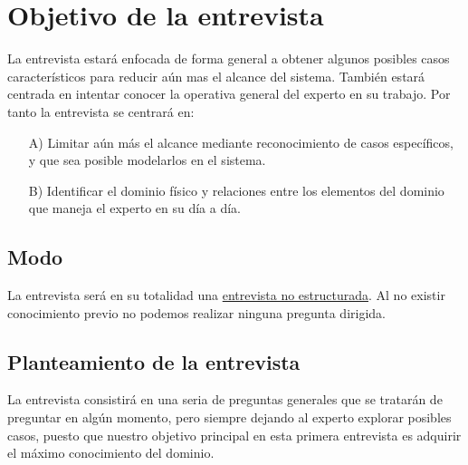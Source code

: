 \documentclass[a4paper,12pt]{article}
\begin{document}
\section{Objetivo de la entrevista}
 La entrevista estará enfocada de forma general a obtener algunos posibles casos característicos para reducir aún mas el alcance del sistema. También estará centrada en intentar conocer la operativa general del experto en su trabajo.
 Por tanto la entrevista se centrará en:
 
 \begin{itemize}
 \item[A)] Limitar aún más el alcance mediante reconocimiento de casos específicos, y que sea posible modelarlos en el sistema.
 \item[B)] Identificar el dominio físico y relaciones entre los elementos del dominio que maneja el experto en su día a día.
 \end{itemize}
 
 \subsection{Modo}
 La entrevista será en su totalidad una \underline{entrevista no estructurada}. Al no existir conocimiento previo no podemos realizar ninguna pregunta dirigida.
 
 \subsection{Planteamiento de la entrevista}
 La entrevista consistirá en una seria de preguntas generales que se tratarán de preguntar en algún momento, pero siempre dejando al experto explorar posibles casos, puesto que nuestro objetivo principal en esta primera entrevista es adquirir el máximo conocimiento del dominio.
 
\end{document}

